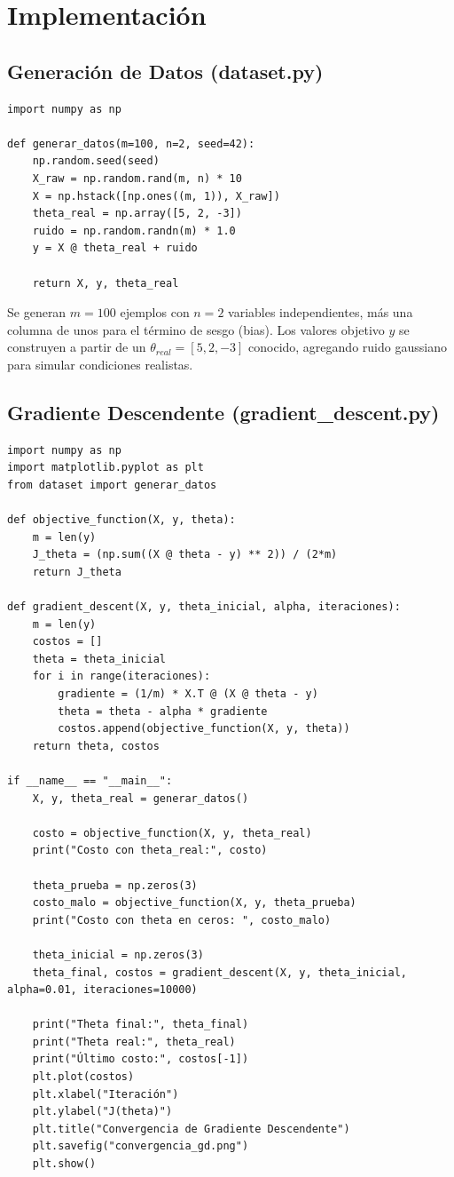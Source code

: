 \documentclass[11pt]{article}
\begin{document}
\section{Implementación}

\subsection{Generación de Datos (dataset.py)}

\begin{lstlisting}
import numpy as np

def generar_datos(m=100, n=2, seed=42):
    np.random.seed(seed)
    X_raw = np.random.rand(m, n) * 10
    X = np.hstack([np.ones((m, 1)), X_raw])
    theta_real = np.array([5, 2, -3])
    ruido = np.random.randn(m) * 1.0
    y = X @ theta_real + ruido

    return X, y, theta_real
\end{lstlisting}

Se generan $m=100$ ejemplos con $n=2$ variables independientes, más una columna de unos para el término de sesgo (bias). Los valores objetivo $y$ se construyen a partir de un $\theta_{real} = [5, 2, -3]$ conocido, agregando ruido gaussiano para simular condiciones realistas.

\subsection{Gradiente Descendente (gradient\_descent.py)}

\begin{lstlisting}
import numpy as np
import matplotlib.pyplot as plt
from dataset import generar_datos

def objective_function(X, y, theta):
    m = len(y)
    J_theta = (np.sum((X @ theta - y) ** 2)) / (2*m)
    return J_theta

def gradient_descent(X, y, theta_inicial, alpha, iteraciones):
    m = len(y)
    costos = []
    theta = theta_inicial
    for i in range(iteraciones):
        gradiente = (1/m) * X.T @ (X @ theta - y)
        theta = theta - alpha * gradiente
        costos.append(objective_function(X, y, theta))
    return theta, costos

if __name__ == "__main__":
    X, y, theta_real = generar_datos()

    costo = objective_function(X, y, theta_real)
    print("Costo con theta_real:", costo)

    theta_prueba = np.zeros(3)
    costo_malo = objective_function(X, y, theta_prueba)
    print("Costo con theta en ceros: ", costo_malo)

    theta_inicial = np.zeros(3)
    theta_final, costos = gradient_descent(X, y, theta_inicial, alpha=0.01, iteraciones=10000)

    print("Theta final:", theta_final)
    print("Theta real:", theta_real)
    print("Último costo:", costos[-1])
    plt.plot(costos)
    plt.xlabel("Iteración")
    plt.ylabel("J(theta)")
    plt.title("Convergencia de Gradiente Descendente")
    plt.savefig("convergencia_gd.png")
    plt.show()
\end{lstlisting}
\end{document}
